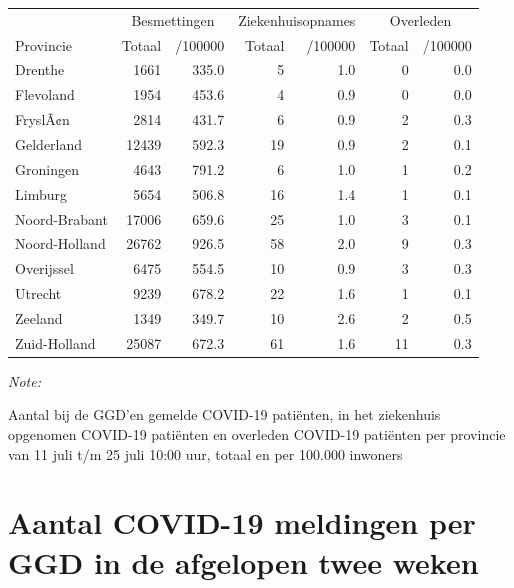\documentclass[
  english,
  man,floatsintext]{apa6}
\begin{document}
\begin{table}
\centering
\begin{threeparttable}
\begin{tabular}{lrrrrrr}
\toprule
\multicolumn{1}{c}{ } & \multicolumn{2}{c}{Besmettingen} & \multicolumn{2}{c}{Ziekenhuisopnames} & \multicolumn{2}{c}{Overleden} \\
\cmidrule(l{3pt}r{3pt}){2-3} \cmidrule(l{3pt}r{3pt}){4-5} \cmidrule(l{3pt}r{3pt}){6-7}
Provincie & Totaal & /100000 & Totaal & /100000 & Totaal & /100000\\
\midrule
Drenthe & 1661 & 335.0 & 5 & 1.0 & 0 & 0.0\\
Flevoland & 1954 & 453.6 & 4 & 0.9 & 0 & 0.0\\
FryslÃ¢n & 2814 & 431.7 & 6 & 0.9 & 2 & 0.3\\
Gelderland & 12439 & 592.3 & 19 & 0.9 & 2 & 0.1\\
Groningen & 4643 & 791.2 & 6 & 1.0 & 1 & 0.2\\
Limburg & 5654 & 506.8 & 16 & 1.4 & 1 & 0.1\\
Noord-Brabant & 17006 & 659.6 & 25 & 1.0 & 3 & 0.1\\
Noord-Holland & 26762 & 926.5 & 58 & 2.0 & 9 & 0.3\\
Overijssel & 6475 & 554.5 & 10 & 0.9 & 3 & 0.3\\
Utrecht & 9239 & 678.2 & 22 & 1.6 & 1 & 0.1\\
Zeeland & 1349 & 349.7 & 10 & 2.6 & 2 & 0.5\\
Zuid-Holland & 25087 & 672.3 & 61 & 1.6 & 11 & 0.3\\
\bottomrule
\end{tabular}
\begin{tablenotes}
\item \textit{Note: } 
\item Aantal bij de GGD’en gemelde COVID-19 patiënten, in het ziekenhuis opgenomen COVID-19 patiënten en overleden COVID-19 patiënten per provincie van 11 juli t/m 25 juli 10:00 uur, totaal en per 100.000 inwoners
\end{tablenotes}
\end{threeparttable}
\end{table}

\newpage

\hypertarget{aantal-covid-19-meldingen-per-ggd-in-de-afgelopen-twee-weken}{%
\section{Aantal COVID-19 meldingen per GGD in de afgelopen twee weken}\label{aantal-covid-19-meldingen-per-ggd-in-de-afgelopen-twee-weken}}
\end{document}
